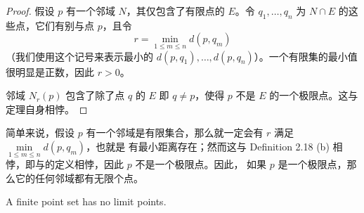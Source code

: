 \documentclass[../poma-notes.tex]{subfiles}
\begin{document}
\begin{proof}
  假设 $p$ 有一个邻域 $N$，其仅包含了有限点的 $E$。令 $q_1,\dots,q_n$ 为 $N \cap E$ 的这些点，它们有别与点 $p$，且令
  \[r = \min\limits_{1 \le m \le n} d(p,q_m)\]
  （我们使用这个记号来表示最小的 $d(p,q_1),\dots,d(p,q_n)$）。一个有限集的最小值很明显是正数，因此 $r>0$。

  邻域 $N_r(p)$ 包含了除了点 $q$ 的 $E$ 即 $q \ne p$，使得 $p$ 不是 $E$ 的一个极限点。这与定理自身相悖。
\end{proof}

\anote 简单来说，假设 $p$ 有一个邻域是有限集合，那么就一定会有 $r$ 满足 $\min\limits_{1 \le m \le n} d(p,q_m)$，也就是
有最小距离存在；然而这与 Definition 2.18 (b) 相悖，即与的定义相悖，因此 $p$ 不是一个极限点。因此，
如果 $p$ 是一个极限点，那么它的任何邻域都有无限个点。

\begin{corollary}
  A finite point set has no limit points.
\end{corollary}
\end{document}
